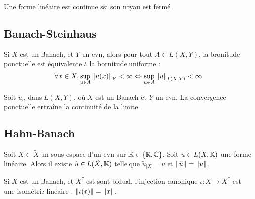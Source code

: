 \documentclass{cours}
\begin{document}
\begin{lemma}
    Une forme linéaire est continue ssi son noyau est fermé.
\end{lemma}

\subsection{Banach-Steinhaus}
\begin{theorem}\label{thm:BanachSteinhaus}
    Si $X$ est un Banach, et $Y$ un evn, alors pour tout $A \subset L(X, Y)$, la bronitude ponctuelle est équivalente à la bornitude uniforme : 
    \[
        \forall x \in X, \sup_{u \in A} \left\lVert u(x)\right\rVert_{Y} < \infty \Leftrightarrow \sup_{u\in A}\left\lVert u\right\rVert_{L(X, Y)} < \infty
    \]
\end{theorem}
\begin{corollary}
    Soit $u_{n}$ dans $L(X, Y)$, où $X$ est un Banach et $Y$ un evn. La convergence ponctuelle entraîne la continuité de la limite. 
\end{corollary}

\subsection{Hahn-Banach}
\begin{theorem}\label{thm:HahnBanach}
    Soit $X \subset \tilde{X}$ un sous-espace d'un evn sur $\mathbb{K} \in \left\{\mathbb{R}, \mathbb{C}\right\}$. Soit $u \in L(X, \mathbb{K})$ une forme linéaire. Alors il existe $\tilde{u} \in L(\tilde{X}, \mathbb{K})$ telle que $\tilde{u}_{\mid X} = u$ et $\left\lVert \tilde{u}\right\rVert = \left\lVert u\right\rVert$.
\end{theorem}

\begin{corollary}
    Si $X$ est un Banach, et $X^{''}$ est sont bidual, l'injection canonique $\iota : X \rightarrow X^{''}$ est une isométrie linéaire : $\left\lVert \iota(x)\right\rVert = \left\lVert x\right\rVert$.
\end{corollary}
\end{document}
